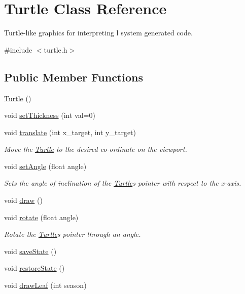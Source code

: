 \hypertarget{classTurtle}{}\section{Turtle Class Reference}
\label{classTurtle}


Turtle-\/like graphics for interpreting l system generated code.  




{\ttfamily \#include $<$turtle.\+h$>$}

\subsection*{Public Member Functions}
\begin{DoxyCompactItemize}
\item 
\hyperlink{classTurtle_a1610c37c2e750169f25b074e62db755d}{Turtle} ()
\item 
void \hyperlink{classTurtle_a1c169d579e98d34f812b3ef347913bf5}{set\+Thickness} (int val=0)
\item 
void \hyperlink{classTurtle_a1ac311827ae11900b6d0dd76304f72a5}{translate} (int x\+\_\+target, int y\+\_\+target)\hypertarget{classTurtle_a1ac311827ae11900b6d0dd76304f72a5}{}\label{classTurtle_a1ac311827ae11900b6d0dd76304f72a5}

\begin{DoxyCompactList}\small\item\em Move the \hyperlink{classTurtle}{Turtle} to the desired co-\/ordinate on the viewport. \end{DoxyCompactList}\item 
void \hyperlink{classTurtle_ace9c83560bdcb5c9480d017f000a724b}{set\+Angle} (float angle)\hypertarget{classTurtle_ace9c83560bdcb5c9480d017f000a724b}{}\label{classTurtle_ace9c83560bdcb5c9480d017f000a724b}

\begin{DoxyCompactList}\small\item\em Sets the angle of inclination of the \hyperlink{classTurtle}{Turtle}\textquotesingle{}s pointer with respect to the x-\/axis. \end{DoxyCompactList}\item 
void \hyperlink{classTurtle_a2461a61b2d42bca39c466e75af3cd4e3}{draw} ()
\item 
void \hyperlink{classTurtle_a4f667fe3bee778bb6d37071f0bcabd34}{rotate} (float angle)\hypertarget{classTurtle_a4f667fe3bee778bb6d37071f0bcabd34}{}\label{classTurtle_a4f667fe3bee778bb6d37071f0bcabd34}

\begin{DoxyCompactList}\small\item\em Rotate the \hyperlink{classTurtle}{Turtle}\textquotesingle{}s pointer through an angle. \end{DoxyCompactList}\item 
void \hyperlink{classTurtle_abfdb07aa29fc62888d3f28cc68c951f4}{save\+State} ()
\item 
void \hyperlink{classTurtle_ad96aa7929b2421e3b30ebb76b2295880}{restore\+State} ()
\item 
void \hyperlink{classTurtle_ad4b3f0ac2d861c1dbb080585a0ed92c2}{draw\+Leaf} (int season)
\end{DoxyCompactItemize}
